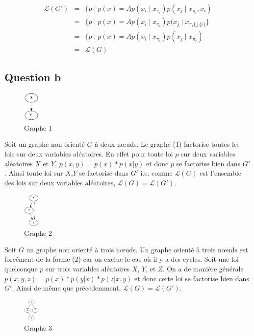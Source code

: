 \documentclass{article}
\begin{document}
\begin{align}
\mathcal{L}(G') & = & \{ p \mid p(x) = A p(x_i \mid x_{\pi_i}) p(x_j \mid x_{\pi_i}, x_i) \\
	        & = & \{ p \mid p(x) = A p(x_i \mid x_{\pi_i}) p(x_j \mid x_{\pi_i \bigcup \{i\}} \} \\
		& = & \{ p \mid p(x) = A p(x_i \mid x_{\pi_i}) p(x_j \mid x_{\pi_j}) \\
		& = & \mathcal{L}(G)
\end{align}


\subsection{Question b}

\begin{figure}[h]
  \caption{Graphe 1}
  \includegraphics[width=30px]{1.png}
\end{figure}

Soit un graphe non orienté $G$ à deux nœuds. Le graphe (1) factorise toutes
les lois sur deux variables aléatoires. En effet pour toute loi $p$ sur deux
variables aléatoires $X$ et $Y$, $p(x,y)=p(x)*p(x|y)$ et donc $p$ se factorise
bien dans $G'$. Ainsi toute loi sur $X$,$Y$ se factorise dans $G'$ i.e. comme
$\mathcal{L}(G)$ est l'ensemble des lois sur deux variables aléatoires,
$\mathcal{L}(G)=\mathcal{L}(G')$.

\begin{figure}[h]
  \caption{Graphe 2}
  \includegraphics[width=30px]{2.png}
\end{figure}


Soit $G$ un graphe non orienté à trois nœuds. Un graphe orienté à trois nœuds
est forcément de la forme (2) car on exclue le cas où il y a des cycles. Soit
une loi quelconque $p$ sur trois variables aléatoires $X$, $Y$, et $Z$. On a
de manière générale $p(x,y,z) = p(x)*p(y|x)*p(z|x,y)$ et donc cette loi se
factorise bien dans $G'$. Ainsi de même que précédemment,
$\mathcal{L}(G)=\mathcal{L}(G')$.

\begin{figure}[h]
  \caption{Graphe 3}
  \includegraphics[width=30px]{3.png}
\end{figure}
\end{document}
